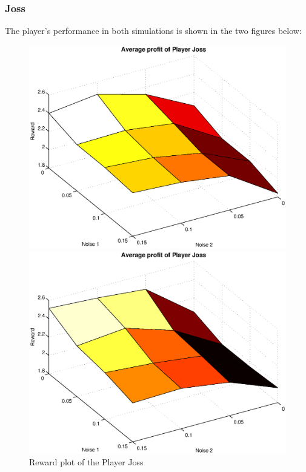 \subsubsection{Joss}
The player's performance in both simulations is shown in the two figures below:
\begin{figure}[h]

\begin{minipage}[hbt]{0.65\textwidth}
	\centering
	\includegraphics[width=\textwidth]{pics/simulation1/Reward_vs_Noise_of_Player_Joss}
\end{minipage}
\hfill
\begin{minipage}[hbt]{0.3\textwidth}
	\centering
	\includegraphics[width=\textwidth]{pics/simulation2/Reward_vs_Noise_of_Player_Joss}
\end{minipage}
	\caption{Reward plot of the Player Joss}
	\label{pic player joss}
\end{figure}

